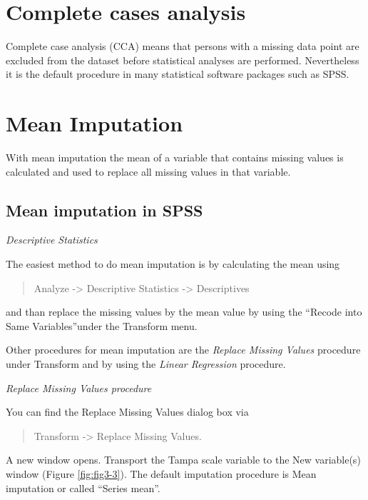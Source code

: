 \documentclass[
]{book}
\begin{document}
\hypertarget{complete-cases-analysis}{%
\section{Complete cases analysis}\label{complete-cases-analysis}}

Complete case analysis (CCA) means that persons with a missing data point are excluded from the dataset before statistical analyses are performed. Nevertheless it is the default procedure in many statistical software packages such as SPSS.

\hypertarget{mean-imputation}{%
\section{Mean Imputation}\label{mean-imputation}}

With mean imputation the mean of a variable that contains missing values is calculated and used to replace all missing values in that variable.

\hypertarget{mean-imputation-in-spss}{%
\subsection{Mean imputation in SPSS}\label{mean-imputation-in-spss}}

\emph{Descriptive Statistics}

The easiest method to do mean imputation is by calculating the mean using

\begin{quote}
Analyze -\textgreater{} Descriptive Statistics -\textgreater{} Descriptives
\end{quote}

and than replace the missing values by the mean value by using the ``Recode into Same Variables''under the Transform menu.

Other procedures for mean imputation are the \emph{Replace Missing Values} procedure under Transform and by using the \emph{Linear Regression} procedure.

\emph{Replace Missing Values procedure}

You can find the Replace Missing Values dialog box via

\begin{quote}
Transform -\textgreater{} Replace Missing Values.
\end{quote}

A new window opens. Transport the Tampa scale variable to the New variable(s) window (Figure \ref{fig:fig3-3}). The default imputation procedure is Mean imputation or called ``Series mean''.
\end{document}
